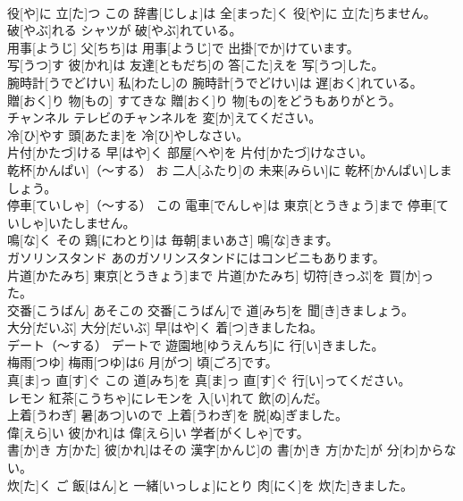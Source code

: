 \documentclass[8pt]{extreport}
\begin{document}
\begin{CJK}{UTF8}{min}
\\	役[や]に 立[た]つ	この 辞書[じしょ]は 全[まった]く 役[や]に 立[た]ちません。		
\\	破[やぶ]れる	シャツが 破[やぶ]れている。		
\\	用事[ようじ]	父[ちち]は 用事[ようじ]で 出掛[でか]けています。		
\\	写[うつ]す	彼[かれ]は 友達[ともだち]の 答[こた]えを 写[うつ]した。		
\\	腕時計[うでどけい]	私[わたし]の 腕時計[うでどけい]は 遅[おく]れている。		
\\	贈[おく]り 物[もの]	すてきな 贈[おく]り 物[もの]をどうもありがとう。		
\\	チャンネル	テレビのチャンネルを 変[か]えてください。		
\\	冷[ひ]やす	頭[あたま]を 冷[ひ]やしなさい。		
\\	片付[かたづ]ける	早[はや]く 部屋[へや]を 片付[かたづ]けなさい。		
\\	乾杯[かんぱい]（～する）	お 二人[ふたり]の 未来[みらい]に 乾杯[かんぱい]しましょう。		
\\	停車[ていしゃ]（～する）	この 電車[でんしゃ]は 東京[とうきょう]まで 停車[ていしゃ]いたしません。		
\\	鳴[な]く	その 鶏[にわとり]は 毎朝[まいあさ] 鳴[な]きます。		
\\	ガソリンスタンド	あのガソリンスタンドにはコンビニもあります。		
\\	片道[かたみち]	東京[とうきょう]まで 片道[かたみち] 切符[きっぷ]を 買[か]った。		
\\	交番[こうばん]	あそこの 交番[こうばん]で 道[みち]を 聞[き]きましょう。		
\\	大分[だいぶ]	大分[だいぶ] 早[はや]く 着[つ]きましたね。		
\\	デート（～する）	デートで 遊園地[ゆうえんち]に 行[い]きました。		
\\	梅雨[つゆ]	梅雨[つゆ]は6 月[がつ] 頃[ごろ]です。		
\\	真[ま]っ 直[す]ぐ	この 道[みち]を 真[ま]っ 直[す]ぐ 行[い]ってください。		
\\	レモン	紅茶[こうちゃ]にレモンを 入[い]れて 飲[の]んだ。		
\\	上着[うわぎ]	暑[あつ]いので 上着[うわぎ]を 脱[ぬ]ぎました。		
\\	偉[えら]い	彼[かれ]は 偉[えら]い 学者[がくしゃ]です。		
\\	書[か]き 方[かた]	彼[かれ]はその 漢字[かんじ]の 書[か]き 方[かた]が 分[わ]からない。		
\\	炊[た]く	ご 飯[はん]と 一緒[いっしょ]にとり 肉[にく]を 炊[た]きました。		

\end{CJK}
\end{document}
